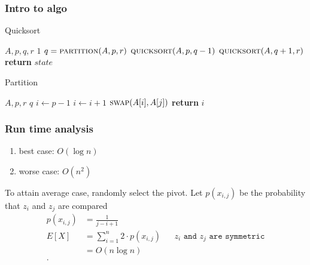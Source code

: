 \documentclass[../../main/main.tex]{subfiles}
\begin{document}
\subsubsection{Intro to algo}
\begin{algorithm}[H]
  \algrenewcommand{}
  \algrenewcommand{}
  \caption{Quicksort}\label{alg:}
  \begin{algorithmic}[1]
    \Require $A,p,q,r$
    \Ensure $1$
    \EndIf
    \State $q = \Call{partition}{A,p,r}$
    \State $\Call{quicksort}{A,p,q-1}$
    \State $\Call{quicksort}{A,q+1, r}$
    \State \textbf{return} $state$
  \end{algorithmic}
\end{algorithm}
\begin{algorithm}[H]
  \algrenewcommand{}
  \algrenewcommand{}
  \caption{Partition}\label{alg:}
  \begin{algorithmic}[1]
    \Require $A,p,r$
    \Ensure $q$
    \State $i \gets p-1$
    \State $i \gets i+1$
    \State $\Call{swap}{A[i], A[j]}$
    \EndIf
    \EndFor
    \State \textbf{return} $i$
  \end{algorithmic}
\end{algorithm}

\subsubsection{Run time analysis}
\begin{enumerate}
  \item best case: $O(\log n)$
  \item worse case: $O(n^2)$
\end{enumerate}

To attain average case, randomly select the pivot. Let $p(x_{i,j})$ be the probability that $z_i$ and $z_j$ are compared
\begin{align*}
  p(x_{i,j}) &= \frac{1}{j-i+1} \\
  E[X]&= \sum^{n}_{i=1} 2\cdot p(x_{i,j}) && \texttt{$z_{i}$ and $z_j$ are symmetric}\\ 
  &= O(n \log n) \\
.\end{align*}
\begin{exercise}
  
\end{exercise}
\end{document}
